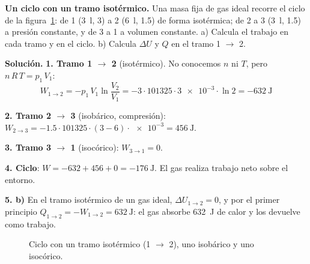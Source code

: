 \begin{example}
    \textbf{Un ciclo con un tramo isotérmico.} Una masa fija de gas ideal recorre el ciclo de la figura~\ref{fig:ud13-res-ciclo}: de 1
    (\qty{3}{\litre}, \qty{3}{\atm}) a 2 (\qty{6}{\litre}, \qty{1.5}{\atm}) de forma isotérmica; de 2 a 3 (\qty{3}{\litre},
    \qty{1.5}{\atm}) a presión constante, y de 3 a 1 a volumen constante. a) Calcula el trabajo en cada tramo y en el ciclo. b) Calcula
    \(\Delta U\) y \(Q\) en el tramo 1 \(\rightarrow\) 2.

    \textbf{Solución.} \textbf{1. Tramo 1 \(\rightarrow\) 2} (isotérmico). No conocemos \(n\) ni \(T\), pero \(n\,R\,T = p_1\,V_1\):
    \[ W_{1\to2} = -p_1\,V_1 \ln\frac{V_2}{V_1} = -3 \cdot 101325 \cdot \num{3e-3} \cdot \ln 2 = \qty{-632}{\joule} \]

    \textbf{2. Tramo 2 \(\rightarrow\) 3} (isobárico, compresión):
    \(W_{2\to3} = -\num{1.5} \cdot 101325 \cdot (3 - 6) \cdot \num{e-3} = \qty{+456}{\joule}\).

    \textbf{3. Tramo 3 \(\rightarrow\) 1} (isocórico): \(W_{3\to1} = 0\).

    \textbf{4. Ciclo}: \(W = -632 + 456 + 0 = \qty{-176}{\joule}\). El gas realiza trabajo neto sobre el entorno.

    \textbf{5. b)} En el tramo isotérmico de un gas ideal, \(\Delta U_{1\to2} = 0\), y por el primer principio
    \(Q_{1\to2} = -W_{1\to2} = \qty{+632}{\joule}\): el gas absorbe \qty{632}{\joule} de calor y los devuelve como trabajo.
\end{example}

\begin{figure}[H]
    \centering
    \caption{Ciclo con un tramo isotérmico (1 \(\rightarrow\) 2), uno isobárico y uno isocórico.}
    \label{fig:ud13-res-ciclo}
\end{figure}

